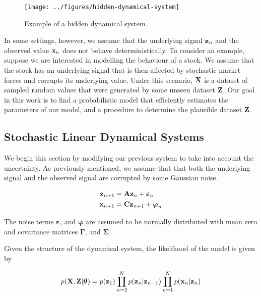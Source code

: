 \documentclass[11pt]{article}
\begin{document}
\begin{figure}[h!]
	\centering
	\texttt{[image: ../figures/hidden-dynamical-system]}
	\caption{Example of a hidden dynamical system.}
	\label{fig:hidden-dynamical-system}
\end{figure}

In some settings, however, we assume that the underlying signal ${\bf z}_n$ and the observed value ${\bf x}_n$ does not behave deterministically. To consider an example, suppose we are interested in modelling the behaviour of a stock. We assume that the stock has an underlying signal that is then affected by stochastic market forces and corrupts its underlying value. Under this scenario, ${\bf X}$ is a dataset of sampled random values that were generated by some unseen dataset ${\bf Z}$. Our goal in this work is to find a probabilistic model that efficiently estimates the parameters of our model, and a procedure to determine the plausible dataset $\bf Z$. 


\subsection{Stochastic Linear Dynamical Systems}
We begin this section by modifying our previous system to take into account the uncertainty. As previously mentioned, we assume that that both the underlying signal and the observed signal are corrupted by some Gaussian noise.
 

\begin{align*}
	{\bf z}_{n+1} &= {\bf A} {\bf z}_{n} + \boldsymbol\varepsilon_n\\
	{\bf x}_{n+1} &= {\bf C} {\bf z}_{n+1} + \boldsymbol\varphi_n
\end{align*}

The noise terms $\boldsymbol{\varepsilon}$, and $\boldsymbol{\varphi}$ are assumed to be normally distributed with mean zero and covariance matrices $\boldsymbol{\Gamma}$, and $\boldsymbol{\Sigma}$.

Given the structure of the dynamical system, the likelihood of the model is given by

\begin{equation}
	p({\bf X}, {\bf Z}\vert\boldsymbol\theta) = p({\bf z}_1)\prod_{n=2}^N p({\bf z}_n\vert {\bf z}_{n-1})\prod_{n=1}^N p({\bf x}_n\vert {\bf z}_n)
\end{equation}
\end{document}
